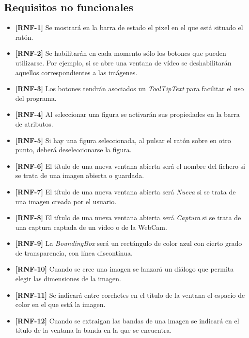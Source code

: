 \subsection{Requisitos no funcionales}
\begin{itemize}
\item{\textbf{[RNF-1]} Se mostrará en la barra de estado el pixel en el que está situado el ratón.}
\item{\textbf{[RNF-2]} Se habilitarán en cada momento sólo los botones que pueden utilizarse. Por ejemplo, si se abre una ventana de vídeo se deshabilitarán aquellos correspondientes a las imágenes.}
\item{\textbf{[RNF-3]} Los botones tendrán asociados un \textit{ToolTipText} para facilitar el uso del programa.}
\item{\textbf{[RNF-4]} Al seleccionar una figura se activarán sus propiedades en la barra de atributos.}
\item{\textbf{[RNF-5]} Si hay una figura seleccionada, al pulsar el ratón sobre en otro punto, deberá deseleccionarse la figura.}
\item{\textbf{[RNF-6]} El título de una nueva ventana abierta será el nombre del fichero si se trata de una imagen abierta o guardada.}
\item{\textbf{[RNF-7]} El título de una nueva ventana abierta será \textit{Nueva} si se trata de una imagen creada por el usuario.}
\item{\textbf{[RNF-8]} El título de una nueva ventana abierta será \textit{Captura} si se trata de una captura captada de un vídeo o de la WebCam.}
\item{\textbf{[RNF-9]} La \textit{BoundingBox} será un rectángulo de color azul con cierto grado de transparencia, con línea discontinua.}
\item{\textbf{[RNF-10]} Cuando se cree una imagen se lanzará un diálogo que permita elegir las dimensiones de la imagen.}
\item{\textbf{[RNF-11]} Se indicará entre corchetes en el título de la ventana el espacio de color en el que está la imagen.}
\item{\textbf{[RNF-12]} Cuando se extraigan las bandas de una imagen se indicará en el título de la ventana la banda en la que se encuentra.}
\end{itemize}

\clearpage

